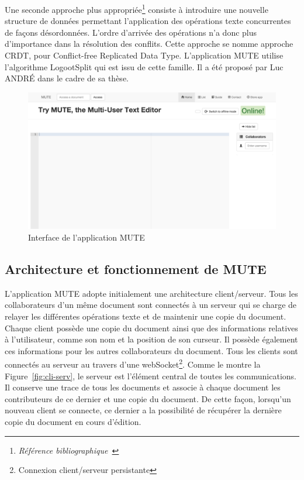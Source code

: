 \documentclass{tnreport}
\begin{document}
Une seconde approche plus appropriée\footnote{\emph{Référence bibliographique~\cite{shapiro:inria-00555588}}} consiste à introduire une nouvelle structure de données permettant l'application des opérations texte concurrentes de façons désordonnées. L'ordre d'arrivée des opérations n'a donc plus d'importance dans la résolution des conflits. Cette approche se nomme approche CRDT, pour Conflict-free Replicated Data Type. L’application MUTE utilise l'algorithme LogootSplit qui est issu de cette famille. Il a été proposé par Luc ANDRÉ dans le cadre de sa thèse.

\begin{figure}[!h]
  \centering
  \includegraphics[width=14cm]{figures/screenshot-mute}
  \caption{Interface de l'application MUTE}
  \label{fig:screen-mute}
\end{figure}


\subsection{Architecture et fonctionnement de MUTE}

L'application MUTE adopte initialement une architecture client/serveur. Tous les collaborateurs d'un même document sont connectés à un serveur qui se charge de relayer les différentes opérations texte et de maintenir une copie du document. Chaque client possède une copie du document ainsi que des informations relatives à l'utilisateur, comme son nom et la position de son curseur. Il possède également ces informations pour les autres collaborateurs du document. Tous les clients sont connectés au serveur au travers d'une webSocket\footnote{Connexion client/serveur persistante}. Comme le montre la Figure~\ref{fig:cli-serv}, le serveur est l'élément central de toutes les communications. Il conserve une trace de tous les documents et associe à chaque document les contributeurs de ce dernier et une copie du document. De cette façon, lorsqu'un nouveau client se connecte, ce dernier a la possibilité de récupérer la dernière copie du document en cours d'édition. 
\end{document}
